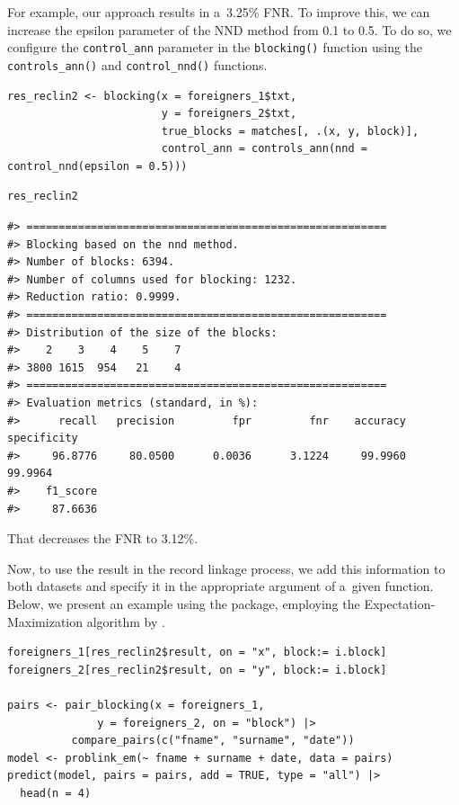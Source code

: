 For example, our approach results in
a~3.25\% FNR. To improve
this, we can increase the epsilon parameter of the NND method from 0.1
to 0.5. To do so, we configure the \texttt{control\_ann} parameter in the
\texttt{blocking()} function using the \texttt{controls\_ann()} and \texttt{control\_nnd()}
functions.

\begin{verbatim}
res_reclin2 <- blocking(x = foreigners_1$txt,
                        y = foreigners_2$txt,
                        true_blocks = matches[, .(x, y, block)],
                        control_ann = controls_ann(nnd = control_nnd(epsilon = 0.5)))
\end{verbatim}


\begin{verbatim}
res_reclin2
\end{verbatim}

\begin{verbatim}
#> ========================================================
#> Blocking based on the nnd method.
#> Number of blocks: 6394.
#> Number of columns used for blocking: 1232.
#> Reduction ratio: 0.9999.
#> ========================================================
#> Distribution of the size of the blocks:
#>    2    3    4    5    7 
#> 3800 1615  954   21    4 
#> ========================================================
#> Evaluation metrics (standard, in %):
#>      recall   precision         fpr         fnr    accuracy specificity 
#>     96.8776     80.0500      0.0036      3.1224     99.9960     99.9964 
#>    f1_score 
#>     87.6636
\end{verbatim}

That decreases the FNR to
3.12\%.

Now, to use the result in the record linkage process, we add this
information to both datasets and specify it in the appropriate argument
of a~given function. Below, we present an example using the
 package, employing the Expectation-Maximization
algorithm by \citet{fellegi1969theory}.

\begin{verbatim}
foreigners_1[res_reclin2$result, on = "x", block:= i.block]
foreigners_2[res_reclin2$result, on = "y", block:= i.block]

pairs <- pair_blocking(x = foreigners_1, 
              y = foreigners_2, on = "block") |>
          compare_pairs(c("fname", "surname", "date")) 
model <- problink_em(~ fname + surname + date, data = pairs)
predict(model, pairs = pairs, add = TRUE, type = "all") |>
  head(n = 4)
\end{verbatim}

